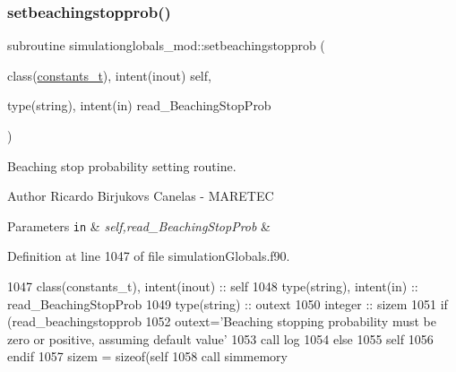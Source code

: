 \subsubsection{\texorpdfstring{setbeachingstopprob()}{setbeachingstopprob()}}
{\footnotesize\ttfamily subroutine simulationglobals\+\_\+mod\+::setbeachingstopprob (\begin{DoxyParamCaption}\item[{class(\mbox{\hyperlink{structsimulationglobals__mod_1_1constants__t}{constants\+\_\+t}}), intent(inout)}]{self,  }\item[{type(string), intent(in)}]{read\+\_\+\+Beaching\+Stop\+Prob }\end{DoxyParamCaption})\hspace{0.3cm}{\ttfamily [private]}}



Beaching stop probability setting routine. 

\begin{DoxyAuthor}{Author}
Ricardo Birjukovs Canelas -\/ M\+A\+R\+E\+T\+EC 
\end{DoxyAuthor}

\begin{DoxyParams}[1]{Parameters}
\mbox{\tt in}  & {\em self,read\+\_\+\+Beaching\+Stop\+Prob} & \\
\hline
\end{DoxyParams}


Definition at line 1047 of file simulation\+Globals.\+f90.


\begin{DoxyCode}
1047     \textcolor{keywordtype}{class}(constants\_t), \textcolor{keywordtype}{intent(inout)} :: self
1048     \textcolor{keywordtype}{type}(string), \textcolor{keywordtype}{intent(in)} :: read\_BeachingStopProb
1049     \textcolor{keywordtype}{type}(string) :: outext
1050     \textcolor{keywordtype}{integer} :: sizem
1051     \textcolor{keywordflow}{if} (read\_beachingstopprob%
1052         outext=\textcolor{stringliteral}{'Beaching stopping probability must be zero or positive, assuming default value'}
1053         \textcolor{keyword}{call }log%
1054     \textcolor{keywordflow}{else}
1055         self%
1056 \textcolor{keywordflow}{    endif}
1057     sizem = sizeof(self%
1058     \textcolor{keyword}{call }simmemory%
\end{DoxyCode}
\mbox{\label{namespacesimulationglobals__mod_af0bc0b00ee3aa2ba9e47dc50daa72799}} 

